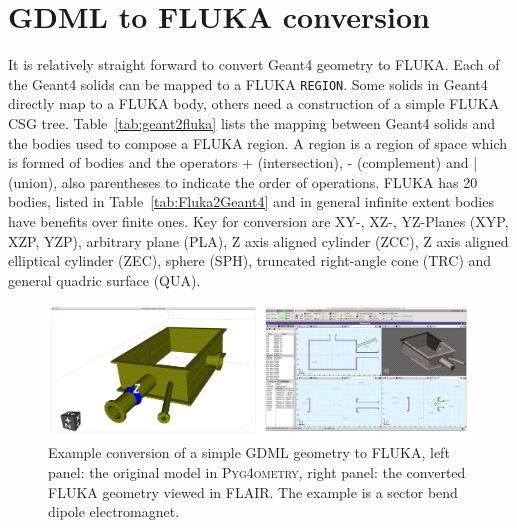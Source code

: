 \documentclass[final,5p,times,twocolumn]{elsarticle}
\newcommand{\PYGEOMETRY}{\textsc{Pyg4ometry}}
\begin{document}
\section{GDML to FLUKA conversion}
It is relatively straight forward to convert Geant4 geometry to FLUKA. Each of the Geant4 
solids can be mapped to a FLUKA \verb|REGION|. Some solids in Geant4 directly map to 
a FLUKA body, others need a construction of a simple FLUKA CSG tree. Table~\ref{tab:geant2fluka}
lists the mapping between Geant4 solids and the bodies used to compose a FLUKA region.
A region is a region of space which is formed of bodies and the operators + (intersection), - 
(complement) and | (union), also parentheses to indicate the order of operations. FLUKA 
has 20 bodies, listed in Table~\ref{tab:Fluka2Geant4}  and in general infinite extent bodies have 
benefits over finite ones. Key for conversion are XY-, XZ-, YZ-Planes (XYP, XZP, YZP), arbitrary 
plane (PLA), Z axis aligned cylinder (ZCC), Z axis aligned elliptical cylinder (ZEC), 
sphere (SPH), truncated right-angle cone (TRC) and general quadric surface (QUA). 
\begin{figure}
\begin{center}
\includegraphics[width=1.0\textwidth]{./model-scene/CuboidalChamber.pdf}
\caption{Example conversion of a simple GDML geometry to FLUKA, left panel:  
the original model in \PYGEOMETRY{}, right panel: the converted FLUKA geometry 
viewed in FLAIR. The example is a sector bend dipole electromagnet.}
\label{fig:gdml-flair}
\end{center}
\end{figure}
\end{document}
